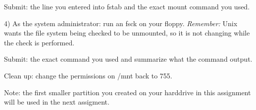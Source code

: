 Submit: the line you entered into {\ltt{}fstab} and
the exact mount command you used.

4) As the system administrator: run an {\ltt{}fsck} on your floppy. 
{\it Remember:} Unix wants the file system being checked to be unmounted,
so it is not changing while the check is performed.

Submit: the exact command you used and summarize what the command output.

Clean up: change the permissions on {\ltt{}/mnt} back to 755.

Note: the first smaller partition you created on your harddrive
in this assignment will be used in the next assigment.
\bye
